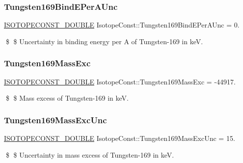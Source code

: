 \subsubsection{\texorpdfstring{Tungsten169\+Bind\+E\+Per\+A\+Unc}{Tungsten169BindEPerAUnc}}
{\footnotesize\ttfamily \mbox{\hyperlink{group___isotope_const-_macros_ga8f45a7272ce02c0b4c65c44636ed719a}{I\+S\+O\+T\+O\+P\+E\+C\+O\+N\+S\+T\+\_\+\+D\+O\+U\+B\+LE}} Isotope\+Const\+::\+Tungsten169\+Bind\+E\+Per\+A\+Unc = 0.}

\$ \$ Uncertainty in binding energy per A of Tungsten-\/169 in keV. \mbox{\label{group___isotope_const-_tungsten-_w169_gadef635c361877351e9ffbea6e430217c}} 
\subsubsection{\texorpdfstring{Tungsten169\+Mass\+Exc}{Tungsten169MassExc}}
{\footnotesize\ttfamily \mbox{\hyperlink{group___isotope_const-_macros_ga8f45a7272ce02c0b4c65c44636ed719a}{I\+S\+O\+T\+O\+P\+E\+C\+O\+N\+S\+T\+\_\+\+D\+O\+U\+B\+LE}} Isotope\+Const\+::\+Tungsten169\+Mass\+Exc = -\/44917.}

\$ \$ Mass excess of Tungsten-\/169 in keV. \mbox{\label{group___isotope_const-_tungsten-_w169_ga784a1b5fec1d0c73826427609ad3c5d5}} 
\subsubsection{\texorpdfstring{Tungsten169\+Mass\+Exc\+Unc}{Tungsten169MassExcUnc}}
{\footnotesize\ttfamily \mbox{\hyperlink{group___isotope_const-_macros_ga8f45a7272ce02c0b4c65c44636ed719a}{I\+S\+O\+T\+O\+P\+E\+C\+O\+N\+S\+T\+\_\+\+D\+O\+U\+B\+LE}} Isotope\+Const\+::\+Tungsten169\+Mass\+Exc\+Unc = 15.}

\$ \$ Uncertainty in mass excess of Tungsten-\/169 in keV. \mbox{\label{group___isotope_const-_tungsten-_w169_ga74efdb565618e2294a3ebf93ef341166}} 
